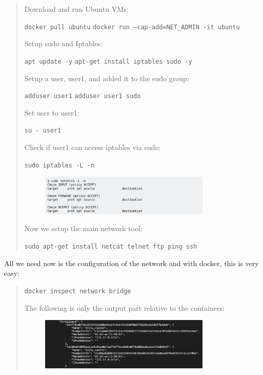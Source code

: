 \documentclass[11pt]{article}
\begin{document}
\begin{quote}
 Download and run Ubuntu VMs:

 \texttt{docker pull ubuntu}\newline
 \texttt{docker run --cap-add=NET\_ADMIN -it ubuntu}\newline

 Setup sudo and Iptables:

 \texttt{apt update -y}\newline
 \texttt{apt-get install iptables sudo -y}\newline

 Setup a user, user1, and added it to the sudo group:

 \texttt{adduser user1}\newline
 \texttt{adduser user1 sudo}\newline

 Set user to user1:

 \texttt{su - user1}\newline

 Check if user1 can access iptables via sudo:

 \texttt{sudo iptables -L -n}\newline
 \begin{figure}[!ht]
 \centering
 \includegraphics[width=0.8\textwidth]{pic1-hw8-1635747.png}
 \label{fig:conf}
 \end{figure}

 Now we setup the main network tool:

 \texttt{sudo apt-get install netcat telnet ftp ping ssh}
\end{quote}

All we need now is the configuration of the network and with docker, this is very easy:
\begin{quote}
 \texttt{docker inspect network bridge}\newline

 The following is only the output part relative to the containers:
 \begin{figure}[!ht]
 \centering
 \includegraphics[width=0.8\textwidth]{pic2-hw8-1635747.png}
 \label{fig:conf}
 \end{figure}
\end{quote}
\end{document}
